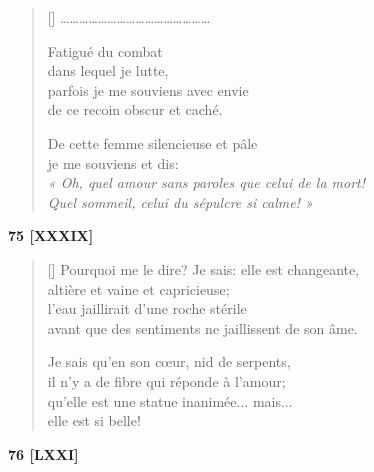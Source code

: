 \documentclass[a4paper,12pt]{book}
\begin{document}
\begin{verse}[\versewidth]
\ldots\ldots\ldots\ldots\ldots\ldots\ldots\ldots\ldots\ldots\ldots\ldots\ldots\ldots\ldots\ldots

  Fatigué du combat \\
  dans lequel je lutte, \\
  parfois je me souviens avec envie \\
  de ce recoin obscur et caché.

  De cette femme silencieuse et pâle \\
  je me souviens et dis: \\
  \emph{« Oh, quel amour sans paroles que celui de la mort! \\
    Quel sommeil, celui du sépulcre si calme! »}
\end{verse}

\bigskip

\begin{center}
  \textbf{75 [XXXIX]}
\end{center}

\settowidth{\versewidth}{Pourquoi me le dire? Je sais: elle est changeante,}

\begin{verse}[\versewidth]
  Pourquoi me le dire? Je sais: elle est changeante, \\
  altière et vaine et capricieuse; \\
  l'eau jaillirait d'une roche stérile \\
  avant que des sentiments ne jaillissent de son âme.

  Je sais qu'en son cœur, nid de serpents, \\
  il n'y a de fibre qui réponde à l'amour; \\
  qu'elle est une statue inanimée... mais... \\
  elle est si belle!
\end{verse}

\bigskip

\begin{center}
  \textbf{76 [LXXI]}
\end{center}

\end{document}
